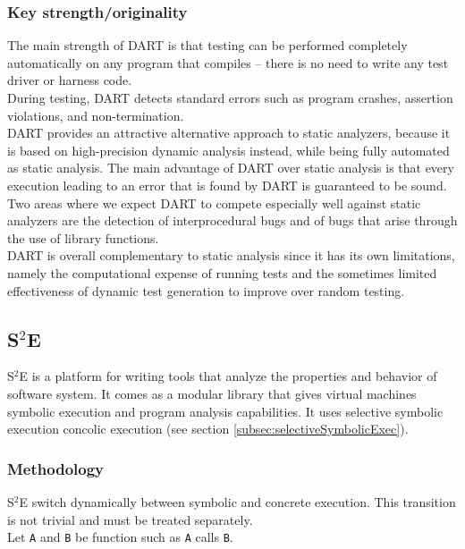 \documentclass[11pt]{IEEEtran}
\begin{document}
	    \subsubsection{Key strength/originality}
	    	The main strength of DART is that testing can be performed completely automatically on any program that compiles – there is no need to write any test driver or harness code.\\
	    	During testing, DART detects standard errors such as program crashes, assertion violations, and non-termination.\\
	    	DART provides an attractive alternative approach to static analyzers, because it is based on high-precision dynamic analysis instead, while being fully automated as static analysis. The main advantage of DART over static analysis is that every execution leading to an error that is found by DART is guaranteed to be sound. Two areas where we expect DART to compete especially well against static analyzers are the detection of interprocedural bugs and of bugs that arise through the use of library functions.\\

	    	DART is overall complementary to static analysis since it has its own limitations, namely the computational expense of running tests and the sometimes limited effectiveness of dynamic test generation to improve over random testing.

	\subsection{S$^2$E}
    \label{subsec:S2E}
    	S$^2$E is a platform for writing tools that analyze the properties and behavior of software system. It comes as a modular library that gives virtual machines symbolic execution and program analysis capabilities.\cite{S2EWebSite} It uses selective symbolic execution concolic execution (see section  \ref{subsec:selectiveSymbolicExec}).



    	\subsubsection{Methodology}
    		S$^2$E switch dynamically between symbolic and concrete execution. This transition is not trivial and must be treated separately.\\
    		Let \texttt{A} and \texttt{B} be function such as \texttt{A} calls \texttt{B}.\\
\end{document}
